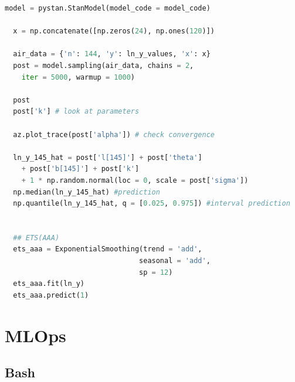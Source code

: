 \documentclass[a4paper, 12pt]{article}
\begin{document}
\begin{lstlisting}[language = Python]
  model = pystan.StanModel(model_code = model_code)

  x = np.concatenate([np.zeros(24), np.ones(120)])

  air_data = {'n': 144, 'y': ln_y_values, 'x': x}
  post = model.sampling(air_data, chains = 2, 
    iter = 5000, warmup = 1000)

  post
  post['k'] # look at parameters

  az.plot_trace(post['alpha']) # check convergence

  ln_y_145_hat = post['l[145]'] + post['theta'] 
    + post['b[145]'] + post['k']
    + 1 * np.random.normal(loc = 0, scale = post['sigma'])
  np.median(ln_y_145_hat) #prediction
  np.quantile(ln_y_145_hat, q = [0.025, 0.975]) #interval prediction


  ## ETS(AAA)
  ets_aaa = ExponentialSmoothing(trend = 'add', 
                                seasonal = 'add',
                                sp = 12)
  ets_aaa.fit(ln_y)
  ets_aaa.predict(1)
\end{lstlisting}

\section{MLOps}

\subsection{Bash}
\end{document}
